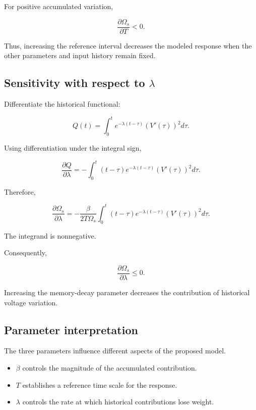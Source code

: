 \documentclass[12pt]{article}
\theoremstyle{definition}
\theoremstyle{remark}
\begin{document}
For positive accumulated variation,

\[
\frac{\partial\Omega_s}{\partial T}<0.
\]

Thus, increasing the reference interval
decreases the modeled response when the
other parameters and input history remain fixed.

\subsection{Sensitivity with respect to \(\lambda\)}

Differentiate the historical functional:

\[
Q(t)=
\int_0^t
e^{-\lambda(t-\tau)}
(V'(\tau))^2d\tau.
\]

Using differentiation under the integral sign,

\[
\frac{\partial Q}{\partial\lambda}
=
-\int_0^t
(t-\tau)e^{-\lambda(t-\tau)}
(V'(\tau))^2d\tau.
\]

Therefore,

\begin{equation}
\frac{\partial\Omega_s}{\partial\lambda}
=
-\frac{\beta}{2T\Omega_s}
\int_0^t
(t-\tau)e^{-\lambda(t-\tau)}
(V'(\tau))^2d\tau.
\label{eq:lambda-sensitivity}
\end{equation}

The integrand is nonnegative.

Consequently,

\[
\frac{\partial\Omega_s}{\partial\lambda}
\leq0.
\]

Increasing the memory-decay parameter
decreases the contribution of historical
voltage variation.

\subsection{Parameter interpretation}

The three parameters influence different
aspects of the proposed model.

\begin{itemize}

    \item \(\beta\) controls the magnitude
    of the accumulated contribution.

    \item \(T\) establishes a reference
    time scale for the response.

    \item \(\lambda\) controls the rate at
    which historical contributions lose weight.

\end{itemize}
\end{document}
